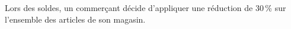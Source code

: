 \documentclass[10pt]{article}
\begin{document}
\setlength\parindent{0mm}
\pagestyle{fancy}
\thispagestyle{empty}
    
    
    




\medskip 

Lors des soldes, un commerçant décide d'appliquer une réduction de 30\,\% sur l'ensemble des articles de son magasin. 

\medskip
\end{document}
